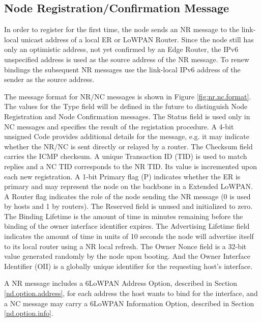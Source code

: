 \subsection{Node Registration/Confirmation Message}
In order to register for the first time, the node sends an NR message to the link-local unicast address of a local ER or LoWPAN Router. Since the node still has only an optimistic address, not yet confirmed by an Edge Router, the IPv6 unspecified address is used as the source address of the NR message. To renew bindings the subsequent NR messages use the link-local IPv6 address of the sender as the source address.

The message format for NR/NC messages is shown in Figure \ref{fig:nr.nc.format}. The values for the Type field will be defined in the future to distinguish Node Registration and Node Confirmation messages. The Status field is used only in NC messages and specifies the result of the registation procedure. A 4-bit unsigned Code provides additional details for the message, e.g. it may indicate whether the NR/NC is sent directly or relayed by a router. The Checksum field carries the ICMP checksum. A unique Transaction ID (TID) is used to match replies and a NC TID corresponds to the NR TID. Its value is incremented upon each new registration. A 1-bit Primary flag (P) indicates whether the ER is primary and may represent the node on the backbone in a Extended LoWPAN. A Router flag indicates the role of the node sending the NR message (0 is used by hosts and 1 by routers).  The Reserved field is unused and initialized to zero. The Binding Lifetime is the amount of time in minutes remaining before the binding of the owner interface identifier expires. The Advertising Lifetime field indicates the amount of time in units of 10 seconds the node will advertise itself to its local router using a NR local refresh. The Owner Nonce field is a 32-bit value generated randomly by the node upon booting.
And the Owner Interface Identifier (OII) is a globally unique identifier for the requesting host's interface.

A NR message includes a 6LoWPAN  Address Option, described in Section \ref{nd.option.address}, for each address the host wants to bind for the interface, and a NC message may carry a 6LoWPAN Information Option, described in Section \ref{nd.option.info}.

